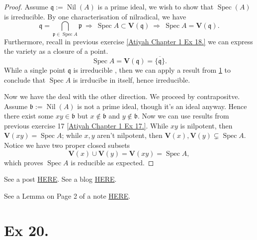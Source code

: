 \begin{proof}
    Assume $\mathfrak q:=\operatorname{Nil}(A)$ is a prime ideal, we wish to show that $\operatorname{Spec}(A)$ is irreducible. By one characterisation of nilradical, we have 
    $$\mathfrak q=\bigcap_{\mathfrak p\in\operatorname{Spec}A}\mathfrak p ~\Rightarrow~ \operatorname{Spec}A\subset \mathbf V(\mathfrak q)~\Rightarrow~ \operatorname{Spec}A= \mathbf V(\mathfrak q).$$
    Furthermore, recall in previous exercise \ref{Atiyah Chapter 1 Ex 18.} we can express the variety as a closure of a point.
    $$\operatorname{Spec}A=\mathbf V(\mathfrak q)=\overline{\{\mathfrak q\}}.$$
    While a single point $\mathfrak q$ is irreducible , then we can apply a result from \ref{Atiyah Chapter 1 Ex 20.} to conclude that $\operatorname{Spec}A$ is irrducibe in itself, hence irreducible.

    Now we have the deal with the other direction. We proceed by contrapositve. Assume $\mathfrak b:=\operatorname{Nil}(A)$ is not a prime ideal, though it's an ideal anyway. Hence there exist some $xy\in \mathfrak b$ but $x\notin \mathfrak b$ and $y\notin \mathfrak b$. 
    Now we can use results from previous exercise 17 \ref{Atiyah Chapter 1 Ex 17.}. While $xy$ is nilpotent, then $\mathbf V(xy)=\operatorname{Spec} A$; while $x,y$ aren't nilpotent, then $\mathbf V(x),\mathbf V(y)\subsetneq \operatorname{Spec}A$. Notice we have two proper closed subsets
    $$\mathbf V(x)\cup\mathbf V(y)=\mathbf V(xy)=\operatorname{Spec} A,$$which proves $\operatorname{Spec}A$ is reducible as expected.
\end{proof}

See a post \href{https://math.stackexchange.com/questions/541943/spectrum-of-a-ring-is-irreducible-if-and-only-if-nilradical-is-prime-atiyah-mac}{HERE}.
See a blog \href{https://mathstrek.blog/2020/04/01/commutative-algebra-14/}{HERE}.

See a Lemma on Page 2 of a note \href{https://ocw.mit.edu/courses/18-726-algebraic-geometry-spring-2009/3723a99e97b581828fd782b9ffd83921_MIT18_726s09_lec11_more_schemes.pdf}{HERE}.



\section{Ex 20.}\label{Atiyah Chapter 1 Ex 20.}

